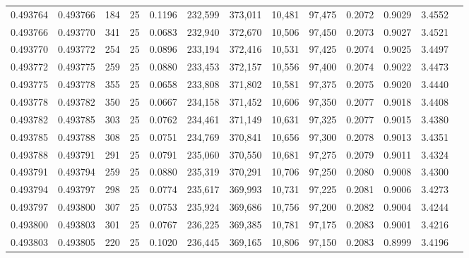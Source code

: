 \begin{tabular}{rrrrrrrrrrrrr}
0.493764 & 0.493766 &   184 &  25 &                                     0.1196 & 232,599 & 373,011 &  10,481 &  97,475 & 0.2072 & 0.9029 & 3.4552 \\
0.493766 & 0.493770 &   341 &  25 &                                     0.0683 & 232,940 & 372,670 &  10,506 &  97,450 & 0.2073 & 0.9027 & 3.4521 \\
0.493770 & 0.493772 &   254 &  25 &                                     0.0896 & 233,194 & 372,416 &  10,531 &  97,425 & 0.2074 & 0.9025 & 3.4497 \\
0.493772 & 0.493775 &   259 &  25 &                                     0.0880 & 233,453 & 372,157 &  10,556 &  97,400 & 0.2074 & 0.9022 & 3.4473 \\
0.493775 & 0.493778 &   355 &  25 &                                     0.0658 & 233,808 & 371,802 &  10,581 &  97,375 & 0.2075 & 0.9020 & 3.4440 \\
0.493778 & 0.493782 &   350 &  25 &                                     0.0667 & 234,158 & 371,452 &  10,606 &  97,350 & 0.2077 & 0.9018 & 3.4408 \\
0.493782 & 0.493785 &   303 &  25 &                                     0.0762 & 234,461 & 371,149 &  10,631 &  97,325 & 0.2077 & 0.9015 & 3.4380 \\
0.493785 & 0.493788 &   308 &  25 &                                     0.0751 & 234,769 & 370,841 &  10,656 &  97,300 & 0.2078 & 0.9013 & 3.4351 \\
0.493788 & 0.493791 &   291 &  25 &                                     0.0791 & 235,060 & 370,550 &  10,681 &  97,275 & 0.2079 & 0.9011 & 3.4324 \\
0.493791 & 0.493794 &   259 &  25 &                                     0.0880 & 235,319 & 370,291 &  10,706 &  97,250 & 0.2080 & 0.9008 & 3.4300 \\
0.493794 & 0.493797 &   298 &  25 &                                     0.0774 & 235,617 & 369,993 &  10,731 &  97,225 & 0.2081 & 0.9006 & 3.4273 \\
0.493797 & 0.493800 &   307 &  25 &                                     0.0753 & 235,924 & 369,686 &  10,756 &  97,200 & 0.2082 & 0.9004 & 3.4244 \\
0.493800 & 0.493803 &   301 &  25 &                                     0.0767 & 236,225 & 369,385 &  10,781 &  97,175 & 0.2083 & 0.9001 & 3.4216 \\
0.493803 & 0.493805 &   220 &  25 &                                     0.1020 & 236,445 & 369,165 &  10,806 &  97,150 & 0.2083 & 0.8999 & 3.4196 \\

\end{tabular}

